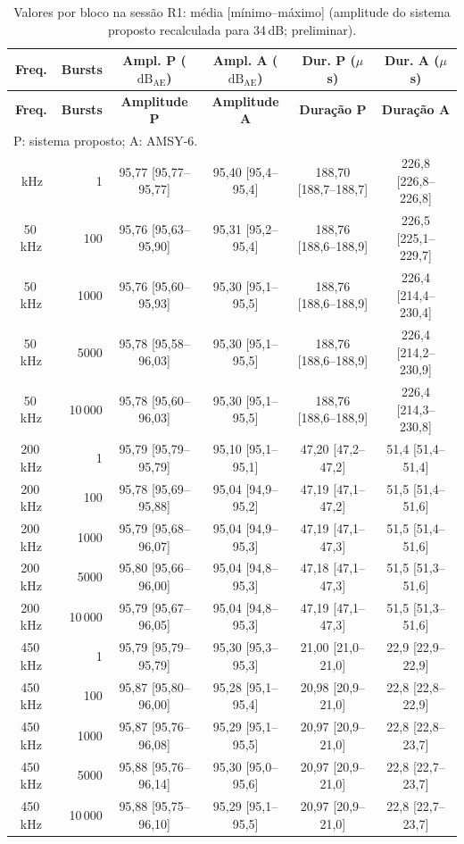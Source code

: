 \begingroup
\scriptsize
\setlength{\tabcolsep}{2pt}
\renewcommand{\arraystretch}{1.12}
\begin{longtable}{|c|r|c|c|c|c|}
	\caption{Valores por bloco na sessão R1: média [mínimo--máximo] (amplitude do sistema proposto recalculada para 34\,dB; preliminar).}
	\label{v2:tab:valores_bloco_r1}\\
	\hline
	\textbf{Freq.} & \textbf{Bursts} & \textbf{Ampl. P (\(\mathrm{dB}_{\mathrm{AE}}\))} & \textbf{Ampl. A (\(\mathrm{dB}_{\mathrm{AE}}\))} & \textbf{Dur. P (\(\mu\)s)} & \textbf{Dur. A (\(\mu\)s)} \\
	\hline
	\endfirsthead
	\hline
	\textbf{Freq.} & \textbf{Bursts} & \textbf{Amplitude P} & \textbf{Amplitude A} & \textbf{Duração P} & \textbf{Duração A} \\
	\hline
	\endhead
	\hline
	\multicolumn{6}{|l|}{P: sistema proposto; A: AMSY-6.} \\
	\hline
	\endlastfoot
	50\,kHz & 1 & 95,77 [95,77--95,77] & 95,40 [95,4--95,4] & 188,70 [188,7--188,7] & 226,8 [226,8--226,8] \\
	50\,kHz & 100 & 95,76 [95,63--95,90] & 95,31 [95,2--95,4] & 188,76 [188,6--188,9] & 226,5 [225,1--229,7] \\
	50\,kHz & 1000 & 95,76 [95,60--95,93] & 95,30 [95,1--95,5] & 188,76 [188,6--188,9] & 226,4 [214,4--230,4] \\
	50\,kHz & 5000 & 95,78 [95,58--96,03] & 95,30 [95,1--95,5] & 188,76 [188,6--188,9] & 226,4 [214,2--230,9] \\
	50\,kHz & 10\,000 & 95,78 [95,60--96,03] & 95,30 [95,1--95,5] & 188,76 [188,6--188,9] & 226,4 [214,3--230,8] \\
	\hline
	200\,kHz & 1 & 95,79 [95,79--95,79] & 95,10 [95,1--95,1] & 47,20 [47,2--47,2] & 51,4 [51,4--51,4] \\
	200\,kHz & 100 & 95,78 [95,69--95,88] & 95,04 [94,9--95,2] & 47,19 [47,1--47,2] & 51,5 [51,4--51,6] \\
	200\,kHz & 1000 & 95,79 [95,68--96,07] & 95,04 [94,9--95,3] & 47,19 [47,1--47,3] & 51,5 [51,4--51,6] \\
	200\,kHz & 5000 & 95,80 [95,66--96,00] & 95,04 [94,8--95,3] & 47,18 [47,1--47,3] & 51,5 [51,3--51,6] \\
	200\,kHz & 10\,000 & 95,79 [95,67--96,05] & 95,04 [94,8--95,3] & 47,19 [47,1--47,3] & 51,5 [51,3--51,6] \\
	\hline
	450\,kHz & 1 & 95,79 [95,79--95,79] & 95,30 [95,3--95,3] & 21,00 [21,0--21,0] & 22,9 [22,9--22,9] \\
	450\,kHz & 100 & 95,87 [95,80--96,00] & 95,28 [95,1--95,4] & 20,98 [20,9--21,0] & 22,8 [22,8--22,9] \\
	450\,kHz & 1000 & 95,87 [95,76--96,08] & 95,29 [95,1--95,5] & 20,97 [20,9--21,0] & 22,8 [22,8--23,7] \\
	450\,kHz & 5000 & 95,88 [95,76--96,14] & 95,30 [95,0--95,6] & 20,97 [20,9--21,0] & 22,8 [22,7--23,7] \\
	450\,kHz & 10\,000 & 95,88 [95,75--96,10] & 95,29 [95,1--95,5] & 20,97 [20,9--21,0] & 22,8 [22,7--23,7] \\
\end{longtable}
\endgroup


